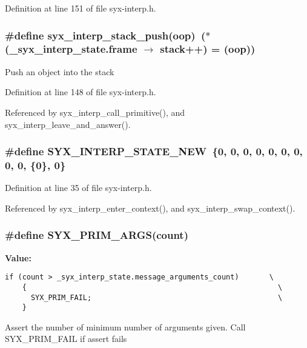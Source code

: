 Definition at line 151 of file syx-interp.h.\hypertarget{syx-interp_8h_72950794ade0181c2f6dbb4f7eb56188}{
\subsubsection{\setlength{\rightskip}{0pt plus 5cm}\#define syx\_\-interp\_\-stack\_\-push(oop)~($\ast$(\_\-syx\_\-interp\_\-state.frame $\rightarrow$ stack++) = (oop))}}
\label{syx-interp_8h_72950794ade0181c2f6dbb4f7eb56188}


Push an object into the stack 

Definition at line 148 of file syx-interp.h.

Referenced by syx\_\-interp\_\-call\_\-primitive(), and syx\_\-interp\_\-leave\_\-and\_\-answer().\hypertarget{syx-interp_8h_36ed8b83722f6b5db96c921d75914c8b}{
\subsubsection{\setlength{\rightskip}{0pt plus 5cm}\#define SYX\_\-INTERP\_\-STATE\_\-NEW~\{0, 0, 0, 0, 0, 0, 0, 0, 0, \{0\}, 0\}}}
\label{syx-interp_8h_36ed8b83722f6b5db96c921d75914c8b}




Definition at line 35 of file syx-interp.h.

Referenced by syx\_\-interp\_\-enter\_\-context(), and syx\_\-interp\_\-swap\_\-context().\hypertarget{syx-interp_8h_d4c3512abbc543dc8804970eef8b2ea3}{
\subsubsection{\setlength{\rightskip}{0pt plus 5cm}\#define SYX\_\-PRIM\_\-ARGS(count)}}
\label{syx-interp_8h_d4c3512abbc543dc8804970eef8b2ea3}


\textbf{Value:}

\begin{Code}\begin{verbatim}if (count > _syx_interp_state.message_arguments_count)       \
    {                                                          \
      SYX_PRIM_FAIL;                                           \
    }
\end{verbatim}
\end{Code}
Assert the number of minimum number of arguments given. Call SYX\_\-PRIM\_\-FAIL if assert fails 

